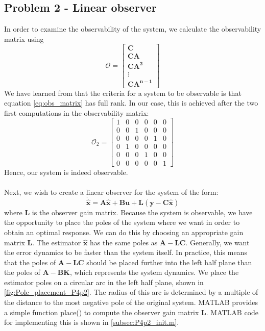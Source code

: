 \subsection{Problem 2 - Linear observer}\label{subsec:P4p2}
In order to examine the observability of the system, we calculate the observability matrix using
\begin{equation}\label{eq:obs_matrix}
    \mathcal{O} = 
    {\begin{bmatrix}\mathbf{C}\\ \mathbf{CA}\\ \mathbf{CA^2}\\ \vdots \\ \mathbf{CA^{n-1}}\end{bmatrix}}
\end{equation}
We have learned from \cite{Lecture_5} that the criteria for a system to be observable is that equation \eqref{eq:obs_matrix} has full rank. In our case, this is achieved after the two first computations in the observability matrix:
\begin{equation}\label{eq:obs_matrix_calc}
    {\mathcal {O}}_{2}=
    {\begin{bmatrix}
        1 & 0 & 0 & 0 & 0 & 0\\
        0 & 0 & 1 & 0 & 0 & 0\\
        0 & 0 & 0 & 0 & 1 & 0\\
        0 & 1 & 0 & 0 & 0 & 0\\
        0 & 0 & 0 & 1 & 0 & 0\\
        0 & 0 & 0 & 0 & 0 & 1
    \end{bmatrix}}
\end{equation}
Hence, our system is indeed observable.\\
\\
Next, we wish to create a linear observer for the system of the form:
\begin{equation}\label{observer_system}
    \mathbf{\dot{\hat{x}} = A\hat{x} + Bu + L(y - C\hat{x})}
\end{equation}
where \textbf{L} is the observer gain matrix.
Because the system is observable, we have the opportunity to place the poles of the system where we want in order to obtain an optimal response. We can do this by choosing an appropriate gain matrix \textbf{L}. The estimator $\mathbf{\hat{x}}$ has the same poles as $\mathbf{A - LC}$. Generally, we want the error dynamics to be faster than the system itself. In practice, this means that the poles of $\mathbf{A - LC}$ should be placed further into the left half plane than the poles of $\mathbf{A - BK}$, which represents the system dynamics. We place the estimator poles on a circular arc in the left half plane, shown in \cref{fig:Pole_placement_P4p2}. The radius of this arc is determined by a multiple of the distance to the most negative pole of the original system. MATLAB provides a simple function place() to compute the observer gain matrix \textbf{L}. MATLAB code for implementing this is shown in \cref{subsec:P4p2_init.m}.
